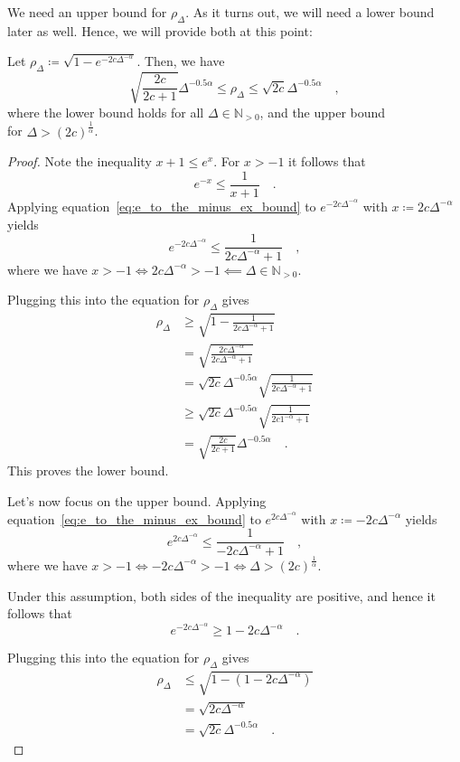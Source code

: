 \documentclass[../../main.tex]{subfiles}
\begin{document}
We need an upper bound for $\rho_\Delta$. As it turns out, we will need a lower bound later as well. Hence, we will provide both at this point:

\begin{proposition}
    Let $\rho_\Delta \coloneqq \sqrt{1 - e^{-2c \Delta^{-\alpha}}}$. Then, we have
    \[
        \sqrt{\frac{2c}{2c + 1}} \Delta^{-0.5 \alpha} \leq \rho_\Delta \leq \sqrt{2c} \Delta^{-0.5 \alpha} \quad ,
    \]
    where the lower bound holds for all $\Delta \in \mathbb{N}_{>0}$, and the upper bound \\ for $\Delta > (2c)^{\frac{1}{\alpha}}$.
\end{proposition}

\begin{proof}
    Note the inequality $x + 1 \leq e^x$. For $x > -1$ it follows that
    \begin{equation}
        e^{-x} \leq \frac{1}{x + 1} \label{eq:e_to_the_minus_ex_bound} \quad .
    \end{equation}
    Applying equation~\ref{eq:e_to_the_minus_ex_bound} to $e^{-2c \Delta^{-\alpha}}$ with $x \coloneqq 2c \Delta^{-\alpha}$ yields
    \[
        e^{-2c \Delta^{-\alpha}} \leq \frac{1}{2c \Delta^{-\alpha} + 1} \quad ,
    \]
    where we have $x > -1 \iff 2c \Delta^{-\alpha} > -1 \impliedby \Delta \in \mathbb{N}_{>0}$.

    Plugging this into the equation for $\rho_\Delta$ gives
    \begin{align*}
        \rho_\Delta &\geq \sqrt{1 - \frac{1}{2c \Delta^{-\alpha} + 1}} \\
        &= \sqrt{\frac{2c \Delta^{-\alpha}}{2c \Delta^{-\alpha} + 1}} \\
        &= \sqrt{2c} \Delta^{-0.5\alpha} \sqrt{\frac{1}{2c \Delta^{-\alpha} + 1}} \\
        &\geq \sqrt{2c} \Delta^{-0.5\alpha} \sqrt{\frac{1}{2c 1^{-\alpha} + 1}} \\
        &= \sqrt{\frac{2c}{2c + 1}} \Delta^{-0.5 \alpha} \quad .
    \end{align*}
    This proves the lower bound.

    Let's now focus on the upper bound. Applying equation~\ref{eq:e_to_the_minus_ex_bound} to $e^{2c \Delta^{-\alpha}}$ with $x \coloneqq -2c \Delta^{-\alpha}$ yields
    \[
        e^{2c \Delta^{-\alpha}} \leq \frac{1}{-2c \Delta^{-\alpha} + 1} \quad ,
    \]
    where we have $x > -1 \iff -2c \Delta^{-\alpha} > -1 \iff \Delta > (2c)^{\frac{1}{\alpha}}$.

    Under this assumption, both sides of the inequality are positive, and hence it follows that
    \[
        e^{-2c \Delta^{-\alpha}} \geq 1 -2c \Delta^{-\alpha} \quad .
    \]

    Plugging this into the equation for $\rho_\Delta$ gives
    \begin{align*}
        \rho_\Delta &\leq \sqrt{1 - (1 -2c \Delta^{-\alpha})} \\
        &= \sqrt{2c \Delta^{-\alpha}} \\
        &= \sqrt{2c} \Delta^{-0.5\alpha} \quad .
    \end{align*}
\end{proof}
\end{document}
